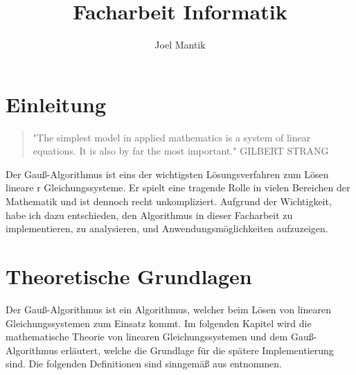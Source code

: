 \documentclass[a4paper, 12pt]{report}
\title{Facharbeit Informatik}
\author{Joel Mantik}
\begin{document}
\maketitle
\begin{sloppypar}
\tableofcontents

\chapter{Einleitung}
\begin{quote}
    "The simplest model in applied mathematics is a system of linear equations. It is also by far the most important."
    \newline GILBERT STRANG
\end{quote}
Der Gauß-Algorithmus ist eins der wichtigsten Lösungsverfahren zum Lösen lineare
r Gleichungssysteme.
Er spielt eine tragende Rolle in vielen Bereichen der Mathematik und ist dennoch  recht unkompliziert.
    Aufgrund der Wichtigkeit, habe ich dazu entschieden, den Algorithmus in dieser
Facharbeit zu implementieren,
zu analysieren, und Anwendungsmöglichkeiten aufzuzeigen.

\chapter{Theoretische Grundlagen}
Der Gauß-Algorithmus ist ein Algorithmus, welcher beim Lösen von linearen Gleichungssystemen zum Einsatz kommt. Im folgenden Kapitel wird die mathematische Theorie
von linearen Gleichungssystemen und dem Gauß-Algorithmus erläutert, welche die Grundlage für die spätere Implementierung sind.
Die folgenden Definitionen sind sinngemäß aus \cite{gramlich2021} entnommen.

\end{sloppypar}
\end{document}
